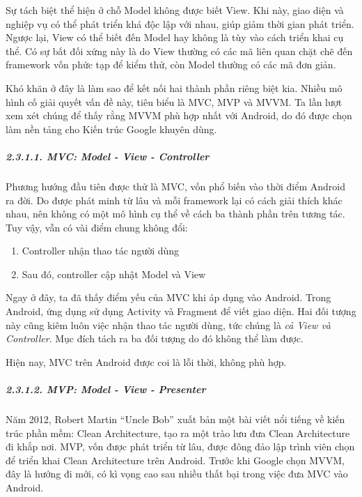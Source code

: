 Sự tách biệt thể hiện ở chỗ Model không được biết View. Khi này, giao
diện và nghiệp vụ có thể phát triển khá độc lập với nhau, giúp giảm thời
gian phát triển. Ngược lại, View có thể biết đến Model hay không là tùy
vào cách triển khai cụ thể. Có sự bất đối xứng này là do View thường có
các mã liên quan chặt chẽ đến framework vốn phức tạp để kiểm thử, còn
Model thường có các mã đơn giản.

Khó khăn ở đây là làm sao để kết nối hai thành phần riêng biệt kia.
Nhiều mô hình cố giải quyết vấn đề này, tiêu biểu là MVC, MVP và MVVM.
Ta lần lượt xem xét chúng để thấy rằng MVVM phù hợp nhất với Android, do
đó được chọn làm nền tảng cho Kiến trúc Google khuyên dùng.

\hypertarget{mvc-model---view---controller}{%
  \subparagraph{2.3.1.1. MVC: Model - View -
    Controller}\label{mvc-model---view---controller}}

Phương hướng đầu tiên được thử là MVC, vốn phổ biến vào thời điểm
Android ra đời. Do được phát minh từ lâu và mỗi framework lại có cách
giải thích khác nhau, nên không có một mô hình cụ thể về cách ba thành
phần trên tương tác. Tuy vậy, vẫn có vài điểm chung không đổi:

\begin{enumerate}
  \def\labelenumi{\arabic{enumi}.}
  
  \item
        Controller nhận thao tác người dùng
  \item
        Sau đó, controller cập nhật Model và View
\end{enumerate}

Ngay ở đây, ta đã thấy điểm yếu của MVC khi áp dụng vào Android. Trong
Android, ứng dụng sử dụng Activity và Fragment để viết giao diện. Hai
đối tượng này cũng kiêm luôn việc nhận thao tác người dùng, tức chúng là
\emph{cả View và Controller}. Mục đích tách ra ba đối tượng do đó không
thể làm được.

Hiện nay, MVC trên Android được coi là lỗi thời, không phù hợp.

\hypertarget{mvp-model---view---presenter}{%
  \subparagraph{2.3.1.2. MVP: Model - View -
    Presenter}\label{mvp-model---view---presenter}}

Năm 2012, Robert Martin ``Uncle Bob'' xuất bản một bài viết nổi tiếng về
kiến trúc phần mềm: Clean Architecture, tạo ra một trào lưu đưa Clean
Architecture đi khắp nơi. MVP, vốn được phát triển từ lâu, được đông đảo
lập trình viên chọn để triển khai Clean Architecture trên Android. Trước
khi Google chọn MVVM, đây là hướng đi mới, có kì vọng cao sau nhiều thất
bại trong việc đưa MVC vào Android.

